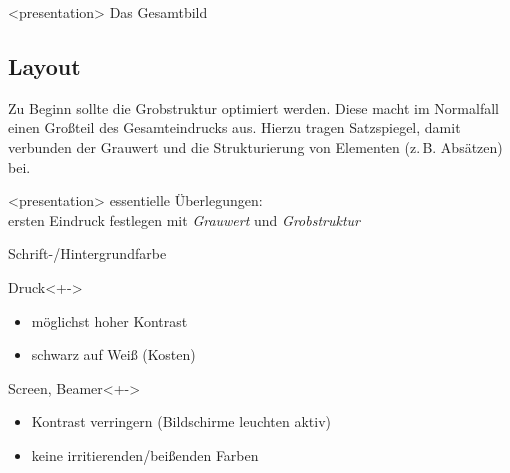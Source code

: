 \begin{frame}<presentation>
  \sectionpage
  \centering
  Das Gesamtbild
\end{frame}

\subsection{Layout}
Zu Beginn sollte die Grobstruktur optimiert werden. Diese macht im
Normalfall einen Großteil des Gesamteindrucks aus. Hierzu tragen
Satzspiegel, damit verbunden der Grauwert und die Strukturierung von
Elementen (z.\,B. Absätzen) bei.
\begin{frame}<presentation>
  \subsectionpage
  \centering
  essentielle Überlegungen: \\
  ersten Eindruck festlegen 
  mit \emph{Grauwert} und \emph{Grobstruktur}
\end{frame}

\begin{frame}{Schrift-/Hintergrundfarbe}
  \begin{block}{Druck}<+->
    \begin{itemize}
    \item möglichst hoher Kontrast%
    \item schwarz auf Weiß (Kosten)
    \end{itemize}
  \end{block}
  \begin{block}{Screen, Beamer}<+->
    \begin{itemize}
    \item Kontrast verringern (Bildschirme leuchten aktiv)
    \item keine irritierenden/beißenden Farben
    \end{itemize}
  \end{block}
\end{frame}

